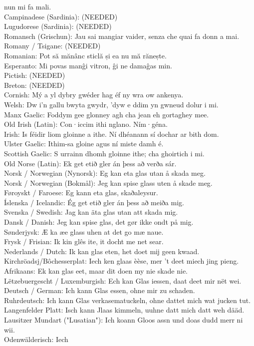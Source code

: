 \documentclass{report}
\begin{document}
nun mi fa mali.\\{} Campinadese (Sardinia): (NEEDED)\\{} Lugudorese (Sardinia): (NEEDED)\\{} Romansch (Grischun): Jau sai mangiar vaider, senza che quai fa donn a mai.\\{} Romany / Tsigane: (NEEDED)\\{} Romanian: Pot să mănânc sticlă și ea nu mă rănește.\\{} Esperanto: Mi povas manĝi vitron, ĝi ne damaĝas min.\\{} Pictish: (NEEDED)\\{} Breton: (NEEDED)\\{} Cornish: Mý a yl dybry gwéder hag éf ny wra ow ankenya.\\{} Welsh: Dw i'n gallu bwyta gwydr, 'dyw e ddim yn gwneud dolur i mi.\\{} Manx Gaelic: Foddym gee glonney agh cha jean eh gortaghey mee.\\{} Old Irish (Latin): Con·iccim ithi nglano. Ním·géna.\\{} Irish: Is féidir liom gloinne a ithe. Ní dhéanann sí dochar ar bith dom.\\{} Ulster Gaelic: Ithim{-}sa gloine agus ní miste damh é.\\{} Scottish Gaelic: S urrainn dhomh gloinne ithe; cha ghoirtich i mi.\\{} Old Norse (Latin): Ek get etið gler án þess að verða sár.\\{} Norsk / Norwegian (Nynorsk): Eg kan eta glas utan å skada meg.\\{} Norsk / Norwegian (Bokmål): Jeg kan spise glass uten å skade meg.\\{} Føroyskt / Faroese: Eg kann eta glas, skaðaleysur.\\{} Íslenska / Icelandic: Ég get etið gler án þess að meiða mig.\\{} Svenska / Swedish: Jag kan äta glas utan att skada mig.\\{} Dansk / Danish: Jeg kan spise glas, det gør ikke ondt på mig.\\{} Sønderjysk: Æ ka æe glass uhen at det go mæ naue.\\{} Frysk / Frisian: Ik kin glês ite, it docht me net sear.\\{} Nederlands / Dutch: Ik kan glas eten, het doet mĳ geen kwaad.\\{} Kirchröadsj/Bôchesserplat: Iech ken glaas èèse, mer 't deet miech jing pieng.\\{} Afrikaans: Ek kan glas eet, maar dit doen my nie skade nie.\\{} Lëtzebuergescht / Luxemburgish: Ech kan Glas iessen, daat deet mir nët wei.\\{} Deutsch / German: Ich kann Glas essen, ohne mir zu schaden.\\{} Ruhrdeutsch: Ich kann Glas verkasematuckeln, ohne dattet mich wat jucken tut.\\{} Langenfelder Platt: Isch kann Jlaas kimmeln, uuhne datt mich datt weh dääd.\\{} Lausitzer Mundart ("Lusatian"): Ich koann Gloos assn und doas dudd merr ni wii.\\{} Odenwälderisch: Iech 
\end{document}
